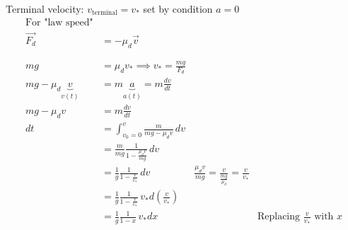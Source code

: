\documentclass[12pt]{article}
\begin{document}
Terminal velocity: $v_\text{terminal} = v_*$ \qquad set by condition $a = 0$
\begin{align*}
	\text{For "law speed"}                                                                                                                                                \\
	\overrightarrow{F_d}             & = -\mu_d \overrightarrow{v}                                                                                                        \\
	\phantom{=}                                                                                                                                                           \\
	mg                               & = \mu_d v_* \implies v_* = \frac{mg}{F_d}                                                                                          \\
	mg - \mu_d \underbrace{v}_{v(t)} & = m \underbrace{a}_{a(t)} = m \frac{dv}{dt}                                                                                        \\
	mg - \mu_d v                     & = m \frac{dv}{dt}                                                                                                                  \\
	dt                               & = \int_{v_0=0}^v \frac{m}{mg-\mu_d v} \, dv                                                                                        \\
	                                 & = \frac{m}{mg} \frac{1}{1 - \frac{\mu_d v}{mg}} \, dv                                                                              \\
	                                 & = \frac{1}{g} \frac{1}{1 - \frac{v}{v_*}} \, dv
	                                 & \frac{\mu_d v}{mg} = \frac{v}{\frac{mg}{\mu_d}} = \frac{v}{v_*}                                                                    \\
	                                 & = \frac{1}{g} \frac{1}{1 - \frac{v}{v_*}} \, v_* d \left(\frac{v}{v_*}\right)                                                      \\
	                                 & = \frac{1}{g} \frac{1}{1 - x} \, v_* d x                                      &  & \text{Replacing } \frac{v}{v_*} \text{ with } x \\
\end{align*}
\end{document}
